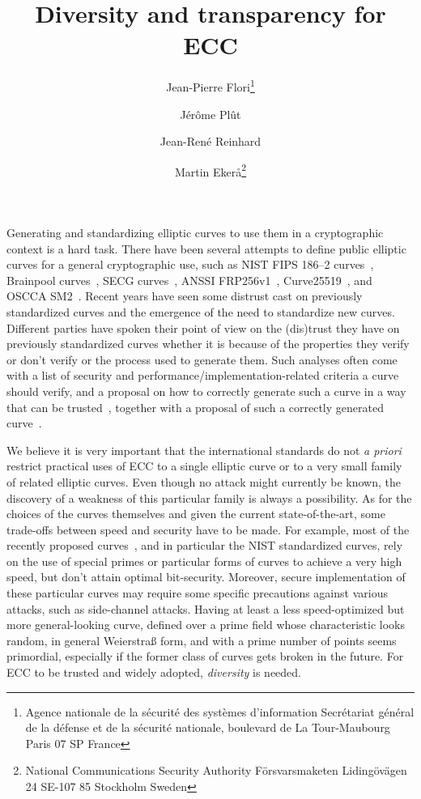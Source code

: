 \documentclass[twocolumn,letterpaper,10pt]{article}
\title{Diversity and transparency for ECC}
\author{Jean-Pierre Flori\thanks{Agence nationale de la sécurité des systèmes d'information\newline%
Secrétariat général de la défense et de la sécurité nationale\newline%
51, boulevard de La Tour-Maubourg\newline%
75700 Paris 07 SP\newline%
France}%
\and Jérôme Plût\footnotemark[1]%
\and Jean-René Reinhard\footnotemark[1]%
\and Martin Ekerå\thanks{National Communications Security Authority\newline%
Försvarsmaketen\newline%
Lidingövägen 24\newline%
SE-107 85 Stockholm\newline%
Sweden}}
\date{}
\def\gitkw$#1:#2${{\small \textbf{#1:} \texttt{#2}}}
\begin{document}
\sloppy
\maketitle
Generating and standardizing elliptic curves to use them in a cryptographic
context is a hard task.
There have been several attempts to define public elliptic curves
for a general cryptographic use,
such as NIST FIPS 186--2 curves~\cite{nist2000fips186-2},
Brainpool curves~\cite{rfc5639},
SECG curves~\cite{certicom2010sec2},
ANSSI FRP256v1~\cite{jorf2011ce},
Curve25519~\cite{pkc2006bernstein},
and OSCCA SM2~\cite{oscca2010sm2}.
Recent years have seen some distrust cast on previously standardized
curves
and the emergence of the need to standardize new curves.
Different parties have spoken their point of view on the (dis)trust they have
on previously standardized curves whether it is because of
the properties they verify or don't verify
or the process used to generate them.
Such analyses often come with
a list of security and performance/implementation-related criteria
a curve should verify,
and a proposal on how to correctly generate such a curve in a way that can be
trusted~\cite{safecurves,msr2014bcln,brainpool2005,eprint2014brainpool,eprint2013abgr},
together with a proposal of such a correctly generated
curve~\cite{pkc2006bernstein,msr2014bcln,eprint2013abgr}.

\medskip
We believe it is very important that the international standards
do not \emph{a priori} restrict practical uses of ECC
to a single elliptic curve
or to a very small family of related elliptic curves.
Even though no attack might currently be known,
the discovery of a weakness of this particular family
is always a possibility.
As for the choices of the curves themselves
and given the current state-of-the-art,
some trade-offs between speed and security have to be made.
For example, most of the recently proposed
curves~\cite{pkc2006bernstein,msr2014bcln,eprint2013abgr,oscca2010sm2},
and in particular the NIST standardized curves,
rely on the use of special primes or particular forms of curves to
achieve a very high speed,
but don't attain optimal bit-security.
Moreover, secure implementation of these particular curves
may require some specific precautions against various attacks,
such as side-channel attacks.
Having at least a less speed-optimized but more general-looking curve,
defined over a prime field whose characteristic looks random,
in general Weierstraß form, and with a prime number of points
seems primordial,
especially if the former class of curves gets broken in the future.
For ECC to be trusted and widely adopted, \emph{diversity} is needed.
\end{document}

